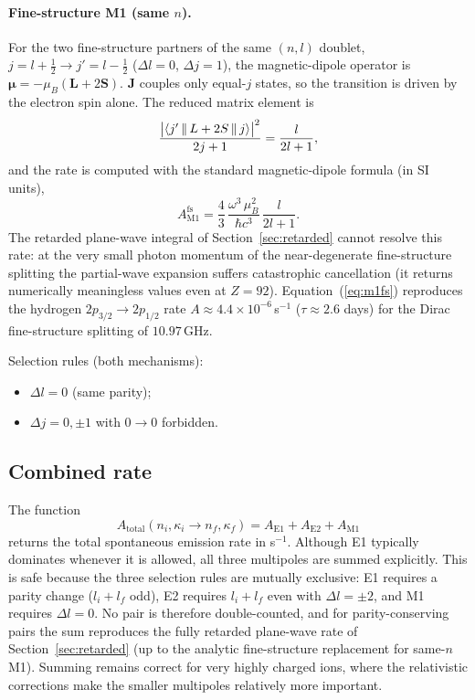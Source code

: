 \documentclass[11pt,a4paper]{article}
\newcommand{\E}{\mathrm{E}}
\newcommand{\M}{\mathrm{M}}
\begin{document}
\paragraph{Fine-structure M1 (same $n$).}
For the two fine-structure partners of the same $(n,l)$ doublet,
$j = l+\tfrac12 \to j' = l-\tfrac12$ ($\Delta l = 0$, $\Delta j = 1$),
the magnetic-dipole operator is $\bm{\mu} = -\mu_{B}(\bm{L}+2\bm{S})$.
$\bm{J}$ couples only equal-$j$ states, so the transition is driven by
the electron spin alone.  The reduced matrix element is
\[
\frac{\bigl|\braket{j'\,\|\,L+2S\,\|\,j}\bigr|^{2}}{2j+1}
  = \frac{l}{2l+1},
\]
and the rate is computed with the standard magnetic-dipole formula
(in SI units),
\begin{equation}
  A_{\M1}^{\mathrm{fs}} = \frac{4}{3}\,
    \frac{\omega^{3}\,\mu_{B}^{2}}{\hbar c^{3}}\,
    \frac{l}{2l+1}.
  \label{eq:m1fs}
\end{equation}
The retarded plane-wave integral of Section~\ref{sec:retarded} cannot
resolve this rate: at the very small photon momentum of the
near-degenerate fine-structure splitting the partial-wave expansion
suffers catastrophic cancellation (it returns numerically meaningless
values even at $Z=92$).  Equation~(\ref{eq:m1fs}) reproduces the
hydrogen $2p_{3/2}\to2p_{1/2}$ rate
$A \approx 4.4\times10^{-6}$\,s${}^{-1}$ ($\tau \approx 2.6$ days) for
the Dirac fine-structure splitting of $10.97$\,GHz.

Selection rules (both mechanisms):
\begin{itemize}
  \item $\Delta l = 0$ (same parity);
  \item $\Delta j = 0,\pm1$ with $0\to0$ forbidden.
\end{itemize}

\subsection{Combined rate}

The function
\[
A_{\text{total}}(n_{i},\kappa_{i}\to n_{f},\kappa_{f})
= A_{\E1} + A_{\E2} + A_{\M1}
\]
returns the total spontaneous emission rate in s${}^{-1}$.  Although
E1 typically dominates whenever it is allowed, all three multipoles
are summed explicitly.  This is safe because the three selection rules
are mutually exclusive: E1 requires a parity change ($l_{i}+l_{f}$ odd),
E2 requires $l_{i}+l_{f}$ even with $\Delta l = \pm2$, and M1 requires
$\Delta l = 0$.  No pair is therefore double-counted, and for
parity-conserving pairs the sum reproduces the fully retarded
plane-wave rate of Section~\ref{sec:retarded} (up to the analytic
fine-structure replacement for same-$n$ M1).  Summing remains correct
for very highly charged ions, where the relativistic corrections make
the smaller multipoles relatively more important.
\end{document}
